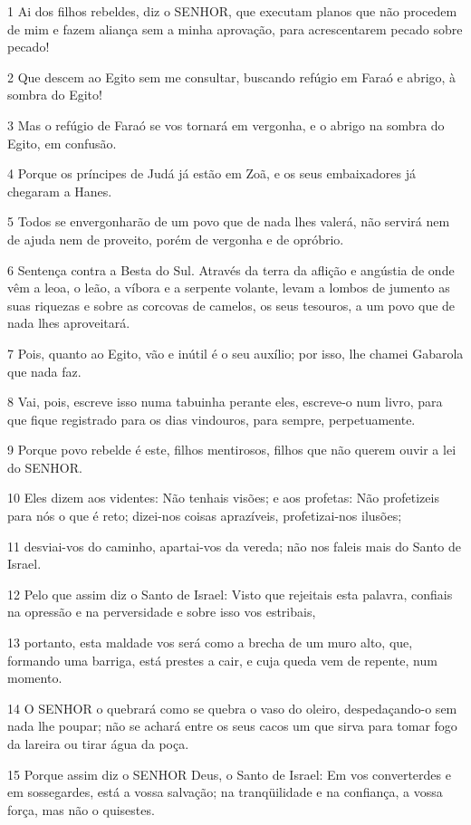 \par 1 Ai dos filhos rebeldes, diz o SENHOR, que executam planos que não procedem de mim e fazem aliança sem a minha aprovação, para acrescentarem pecado sobre pecado!
\par 2 Que descem ao Egito sem me consultar, buscando refúgio em Faraó e abrigo, à sombra do Egito!
\par 3 Mas o refúgio de Faraó se vos tornará em vergonha, e o abrigo na sombra do Egito, em confusão.
\par 4 Porque os príncipes de Judá já estão em Zoã, e os seus embaixadores já chegaram a Hanes.
\par 5 Todos se envergonharão de um povo que de nada lhes valerá, não servirá nem de ajuda nem de proveito, porém de vergonha e de opróbrio.
\par 6 Sentença contra a Besta do Sul. Através da terra da aflição e angústia de onde vêm a leoa, o leão, a víbora e a serpente volante, levam a lombos de jumento as suas riquezas e sobre as corcovas de camelos, os seus tesouros, a um povo que de nada lhes aproveitará.
\par 7 Pois, quanto ao Egito, vão e inútil é o seu auxílio; por isso, lhe chamei Gabarola que nada faz.
\par 8 Vai, pois, escreve isso numa tabuinha perante eles, escreve-o num livro, para que fique registrado para os dias vindouros, para sempre, perpetuamente.
\par 9 Porque povo rebelde é este, filhos mentirosos, filhos que não querem ouvir a lei do SENHOR.
\par 10 Eles dizem aos videntes: Não tenhais visões; e aos profetas: Não profetizeis para nós o que é reto; dizei-nos coisas aprazíveis, profetizai-nos ilusões;
\par 11 desviai-vos do caminho, apartai-vos da vereda; não nos faleis mais do Santo de Israel.
\par 12 Pelo que assim diz o Santo de Israel: Visto que rejeitais esta palavra, confiais na opressão e na perversidade e sobre isso vos estribais,
\par 13 portanto, esta maldade vos será como a brecha de um muro alto, que, formando uma barriga, está prestes a cair, e cuja queda vem de repente, num momento.
\par 14 O SENHOR o quebrará como se quebra o vaso do oleiro, despedaçando-o sem nada lhe poupar; não se achará entre os seus cacos um que sirva para tomar fogo da lareira ou tirar água da poça.
\par 15 Porque assim diz o SENHOR Deus, o Santo de Israel: Em vos converterdes e em sossegardes, está a vossa salvação; na tranqüilidade e na confiança, a vossa força, mas não o quisestes.
